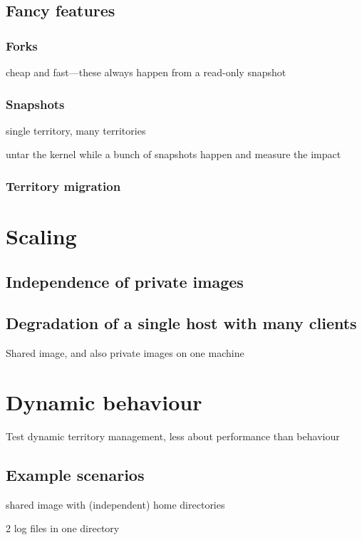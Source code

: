\subsection{Fancy features}
\subsubsection{Forks}

cheap and fast---these always happen from a read-only snapshot

\subsubsection{Snapshots}

single territory, many territories

untar the kernel while a bunch of snapshots happen and measure the impact

\subsubsection{Territory migration}

\section{Scaling}
\subsection{Independence of private images}
\subsection{Degradation of a single host with many clients}
Shared image, and also private images on one machine

\section{Dynamic behaviour}

Test dynamic territory management, less about performance than behaviour

\subsection{Example scenarios}

shared image with (independent) home directories

2 log files in one directory

